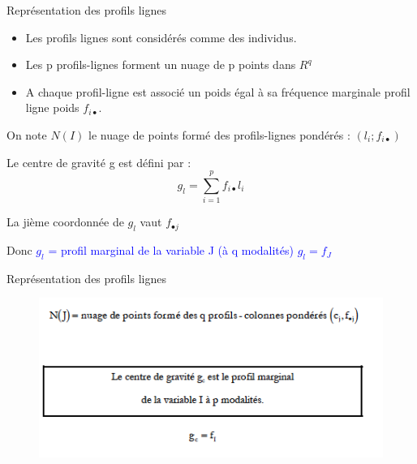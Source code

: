 \documentclass[11pt]{beamer}
\begin{document}
\begin{frame}{Représentation des profils lignes}
\begin{itemize}
\item Les profils lignes sont considérés comme des individus.\\
\item Les p profils-lignes forment un nuage de p points dans $R^q$\\

\item A chaque profil-ligne est associé un poids égal à sa fréquence marginale profil ligne poids
$f_{i \bullet}$.
\end{itemize}
On note $N(I)$ le nuage de points formé des profils-lignes pondérés :
$( l_i; f_{i \bullet})$

Le centre de gravité g est défini par : $$ g_l=\sum_{i=1}^p f_{i \bullet}l_i$$

La jième coordonnée de $g_l$ vaut $f_{\bullet j}$

Donc \textcolor{blue}{$g_l$ = profil marginal de la variable J (à q modalités) $g_l=f_J$}

\end{frame}
\begin{frame}{Représentation des profils lignes}
\begin{figure}
\includegraphics[scale=0.7]{exemple10.png}  
\end{figure}
\end{frame}
\end{document}
